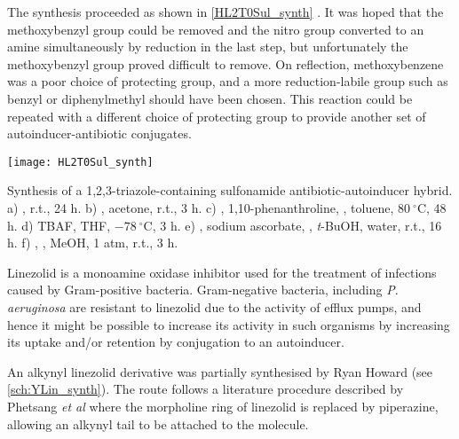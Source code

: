 The synthesis proceeded as shown in \ref{HL2T0Sul_synth} \cite{Bendikov2005,Graux2014,IJsselstijn2006}. It was hoped that the methoxybenzyl group could be removed and the nitro group converted to an amine simultaneously by reduction in the last step, but unfortunately the methoxybenzyl group proved difficult to remove. On reflection, methoxybenzene was a poor choice of protecting group, and a more reduction-labile group such as benzyl or diphenylmethyl should have been chosen\cite{Wuts2007}.
This reaction could be repeated with a different choice of protecting group to provide another set of autoinducer-antibiotic conjugates.

\begin{scheme}[H]
	\begin{center}
		\texttt{[image: HL2T0Sul\_synth]}
		\caption{Synthesis of a 1,2,3-triazole-containing sulfonamide antibiotic-autoinducer hybrid.
		a) , r.t., 24 h. 
		b) , acetone, r.t., 3 h. 
		c) , 1,10-phenanthroline, , toluene, $80\ ^{\circ}$C, 48 h. 
		d) TBAF, THF, $-78\ ^{\circ}$C, 3 h. 
		e) , sodium ascorbate, , \textit{t}-BuOH, water, r.t., 16 h. 
		f) , , MeOH, 1 atm, r.t., 3 h.
		\label{sch:HL2T0Sul_synth}}
	\end{center}
\end{scheme}



Linezolid is a monoamine oxidase inhibitor used for the treatment of infections caused by Gram-positive bacteria.
Gram-negative bacteria, including \textit{P. aeruginosa} are resistant to linezolid due to the activity of efflux pumps, and hence it might be possible to increase its activity in such organisms by increasing its uptake and/or retention by conjugation to an autoinducer.

An alkynyl linezolid derivative  was partially synthesised by Ryan Howard (see \ref{sch:YLin_synth}). The route follows a literature procedure described by Phetsang \textit{et al}\cite{Phetsang2014} where the morpholine ring of linezolid is replaced by piperazine, allowing an alkynyl tail to be attached to the molecule.

